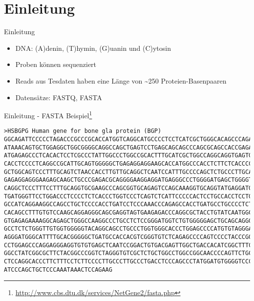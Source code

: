 \section{Einleitung}

\begin{frame}{Einleitung}
    \begin{itemize}
        \item DNA: (A)denin, (T)hymin, (G)uanin und (C)ytosin \pause
        \item Proben können sequenziert \pause
        \item Reads aus Tesdaten haben eine Länge von \textasciitilde 250 Proteien-Basenpaaren \pause
        \item Datensätze: FASTQ, FASTA
    \end{itemize}
\end{frame}


\begin{frame}[fragile]{Einleitung - FASTA Beispiel\footnote{\url{http://www.cbs.dtu.dk/services/NetGene2/fasta.php}}}
    \begin{verbatim}
>HSBGPG Human gene for bone gla protein (BGP)
GGCAGATTCCCCCTAGACCCGCCCGCACCATGGTCAGGCATGCCCCTCCTCATCGCTGGGCACAGCCCAGAGGGT
ATAAACAGTGCTGGAGGCTGGCGGGGCAGGCCAGCTGAGTCCTGAGCAGCAGCCCAGCGCAGCCACCGAGACACC
ATGAGAGCCCTCACACTCCTCGCCCTATTGGCCCTGGCCGCACTTTGCATCGCTGGCCAGGCAGGTGAGTGCCCC
CACCTCCCCTCAGGCCGCATTGCAGTGGGGGCTGAGAGGAGGAAGCACCATGGCCCACCTCTTCTCACCCCTTTG
GCTGGCAGTCCCTTTGCAGTCTAACCACCTTGTTGCAGGCTCAATCCATTTGCCCCAGCTCTGCCCTTGCAGAGG
GAGAGGAGGGAAGAGCAAGCTGCCCGAGACGCAGGGGAAGGAGGATGAGGGCCCTGGGGATGAGCTGGGGTGAAC
CAGGCTCCCTTTCCTTTGCAGGTGCGAAGCCCAGCGGTGCAGAGTCCAGCAAAGGTGCAGGTATGAGGATGGACC
TGATGGGTTCCTGGACCCTCCCCTCTCACCCTGGTCCCTCAGTCTCATTCCCCCACTCCTGCCACCTCCTGTCTG
GCCATCAGGAAGGCCAGCCTGCTCCCCACCTGATCCTCCCAAACCCAGAGCCACCTGATGCCTGCCCCTCTGCTC
CACAGCCTTTGTGTCCAAGCAGGAGGGCAGCGAGGTAGTGAAGAGACCCAGGCGCTACCTGTATCAATGGCTGGG
GTGAGAGAAAAGGCAGAGCTGGGCCAAGGCCCTGCCTCTCCGGGATGGTCTGTGGGGGAGCTGCAGCAGGGAGTG
GCCTCTCTGGGTTGTGGTGGGGGTACAGGCAGCCTGCCCTGGTGGGCACCCTGGAGCCCCATGTGTAGGGAGAGG
AGGGATGGGCATTTTGCACGGGGGCTGATGCCACCACGTCGGGTGTCTCAGAGCCCCAGTCCCCTACCCGGATCC
CCTGGAGCCCAGGAGGGAGGTGTGTGAGCTCAATCCGGACTGTGACGAGTTGGCTGACCACATCGGCTTTCAGGA
GGCCTATCGGCGCTTCTACGGCCCGGTCTAGGGTGTCGCTCTGCTGGCCTGGCCGGCAACCCCAGTTCTGCTCCT
CTCCAGGCACCCTTCTTTCCTCTTCCCCTTGCCCTTGCCCTGACCTCCCAGCCCTATGGATGTGGGGTCCCCATC
ATCCCAGCTGCTCCCAAATAAACTCCAGAAG
    \end{verbatim}
\end{frame}

